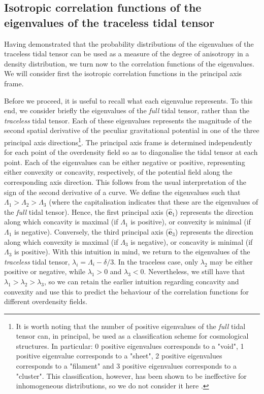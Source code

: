 \documentclass[a4paper,11pt]{article}
\begin{document}
\subsection{Isotropic correlation functions of the eigenvalues of the traceless tidal tensor}\label{sec:iso}

Having demonstrated that the probability distributions of the eigenvalues of the traceless tidal tensor can be used as a measure of the degree of anisotropy in a density distribution, we turn now to the correlation functions of the eigenvalues. We will consider first the isotropic correlation functions in the principal axis frame. 

Before we proceed, it is useful to recall what each eigenvalue represents. To this end, we consider briefly the eigenvalues of the \textit{full} tidal tensor, rather than the \textit{traceless} tidal tensor. Each of these eigenvalues represents the magnitude of the second spatial derivative of the peculiar gravitational potential in one of the three principal axis directions\footnote{It is worth noting that the number of positive eigenvalues of the \textit{full} tidal tensor can, in principal, be used as a classification scheme for cosmological structures. In particular: 0 positive eigenvalues corresponds to a "void", 1 positive eigenvalue corresponds to a "sheet", 2 positive eigenvalues corresponds to a "filament" and 3 positive eigenvalues corresponds to a "cluster". This classification, however, has been shown to be ineffective for inhomogeneous distributions, so we do not consider it here \cite{2016MNRAS.457.2501F}.  
}. The principal axis frame is determined independently for each point of the overdensity field so as to diagonalise the tidal tensor at each point. Each of the eigenvalues can be either negative or positive, representing either convexity or concavity, respectively, of the potential field along the corresponding axis direction. This follows from the usual interpretation of the sign of the second derivative of a curve. We define the eigenvalues such that $\Lambda_1 > \Lambda_2 > \Lambda_3$ (where the capitalisation indicates that these are the eigenvalues of the \textit{full} tidal tensor). Hence, the first principal axis ($\hat{\mathbf{e}}_1$) represents the direction along which concavity is maximal (if $\Lambda_1$ is positive), or convexity is minimal (if $\Lambda_1$ is negative). Conversely, the third principal axis ($\hat{\mathbf{e}}_3$) represents the direction along which convexity is maximal (if $\Lambda_3$ is negative), or concavity is minimal (if $\Lambda_3$ is positive). With this intuition in mind, we return to the eigenvalues of the \textit{traceless} tidal tensor, $\lambda_i = \Lambda_i - \delta/3$. In the traceless case, only $\lambda_2$ may be either positive or negative, while $\lambda_1 > 0$ and $\lambda_3 < 0$. Nevertheless, we still have that $\lambda_1 > \lambda_2 > \lambda_3$, so we can retain the earlier intuition regarding concavity and convexity and use this to predict the behaviour of the correlation functions for different overdensity fields. 
\end{document}
